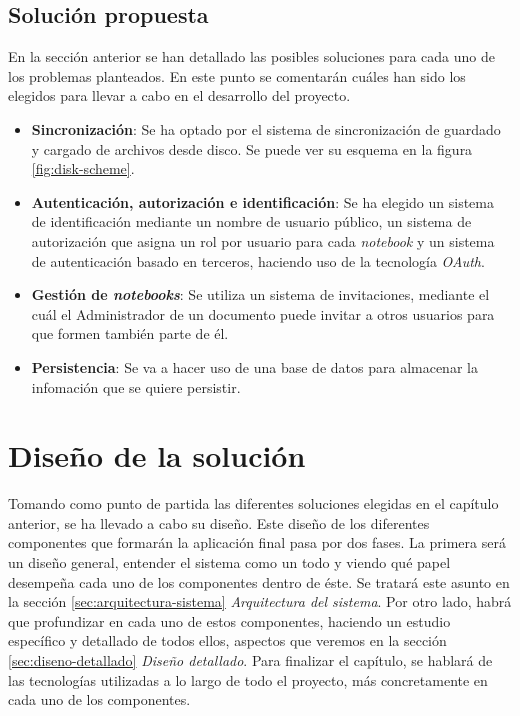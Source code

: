 \documentclass[11pt,spanish,listoffigures]{tfgetsinf}
\begin{document}

\section{Solución propuesta}
\label{sec:solucion-propuesta}

En la sección anterior se han detallado las posibles soluciones para cada uno de los problemas planteados. En este punto se comentarán cuáles han sido los elegidos para llevar a cabo en el desarrollo del proyecto.

\begin{itemize}

\item \textbf{Sincronización}: Se ha optado por el sistema de sincronización de guardado y cargado de archivos desde disco. Se puede ver su esquema en la figura \ref{fig:disk-scheme}. 

\item \textbf{Autenticación, autorización e identificación}: Se ha elegido un sistema de identificación mediante un nombre de usuario público, un sistema de autorización que asigna un rol por usuario para cada \textit{notebook} y un sistema de autenticación basado en terceros, haciendo uso de la tecnología \textit{OAuth}.

\item \textbf{Gestión de \textit{notebooks}}: Se utiliza un sistema de invitaciones, mediante el cuál el Administrador de un documento puede invitar a otros usuarios para que formen también parte de él.

\item \textbf{Persistencia}: Se va a hacer uso de una base de datos para almacenar la infomación que se quiere persistir.

\end{itemize}





\chapter{Diseño de la solución}
\label{ch:diseno-solu}

Tomando como punto de partida las diferentes soluciones elegidas en el capítulo anterior, se ha llevado a cabo su diseño. Este diseño de los diferentes componentes que formarán la aplicación final pasa por dos fases. La primera será un diseño general, entender el sistema como un todo y viendo qué papel desempeña cada uno de los componentes dentro de éste. Se tratará este asunto en la sección \ref{sec:arquitectura-sistema} \textit{Arquitectura del sistema}. Por otro lado, habrá que profundizar en cada uno de estos componentes, haciendo un estudio específico y detallado de todos ellos, aspectos que veremos en la sección \ref{sec:diseno-detallado} \textit{Diseño detallado}. Para finalizar el capítulo, se hablará de las tecnologías utilizadas a lo largo de todo el proyecto, más concretamente en cada uno de los componentes.
\end{document}
